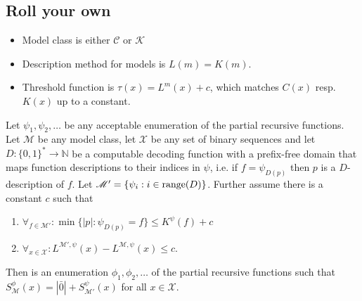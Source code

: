 \documentclass{style/llncs}
\newcommand{\M}{\mathscr M}
\newcommand{\C}{\mathscr C}
\newcommand{\K}{\mathscr K}
\newcommand{\X}{\mathscr X}
\newcommand{\N}{\mathbb N}
\newcommand{\tn}[1]{\textnormal{#1}}
\begin{document}
\subsection{Roll your own}


\begin{itemize}
\item Model class is either $\C$ or $\K$
\item Description method for models is $L(m)=K(m)$.
\item Threshold function is $\tau(x)=L^m(x)+c$, which matches $C(x)$
  resp. $K(x)$ up to a constant.
\end{itemize}


\begin{lemma}\label{lem:thecoolone}
  Let $\psi_1,\psi_2,\ldots$ be any acceptable enumeration of the partial recursive functions.
  Let $\M$ be any model class, let $\X$ be any set of binary sequences and let $D:\{0,1\}^*\to\N$ be a computable decoding function with a prefix-free domain that maps function descriptions to their indices in $\psi$, i.e. if $f=\psi_{D(p)}$ then $p$ is a $D$-description of $f$. Let $\M'=\{\psi_i:i\in\tn{range}(D)\}$. Further assume there is a constant $c$ such that
\begin{enumerate}
  \item $\forall_{f\in\M'}:\min\{|p|:\psi_{D(p)}=f\}\le K^\psi(f)+c$
  \item $\forall_{x\in\X}:L^{\M',\psi}(x)-L^{\M,\psi}(x)\le c$.
\end{enumerate}
Then is an enumeration $\phi_1,\phi_2,\ldots$ of the partial recursive functions such that $S^\phi_{\M}(x) = |\bar 0|+S^\psi_{\M'}(x)$ for all $x\in\X$.
\end{lemma}
\end{document}
